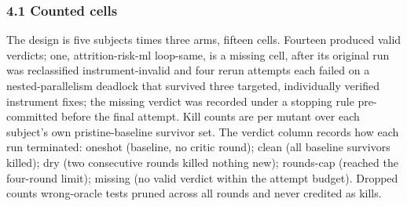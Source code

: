 \documentclass[
  11pt,
]{article}
\begin{document}
\subsubsection{4.1 Counted cells}\label{counted-cells}

The design is five subjects times three arms, fifteen cells. Fourteen
produced valid verdicts; one, attrition-risk-ml loop-same, is a missing
cell, after its original run was reclassified instrument-invalid and
four rerun attempts each failed on a nested-parallelism deadlock that
survived three targeted, individually verified instrument fixes; the
missing verdict was recorded under a stopping rule pre-committed before
the final attempt. Kill counts are per mutant over each subject's own
pristine-baseline survivor set. The verdict column records how each run
terminated: oneshot (baseline, no critic round); clean (all baseline
survivors killed); dry (two consecutive rounds killed nothing new);
rounds-cap (reached the four-round limit); missing (no valid verdict
within the attempt budget). Dropped counts wrong-oracle tests pruned
across all rounds and never credited as kills.
\end{document}

